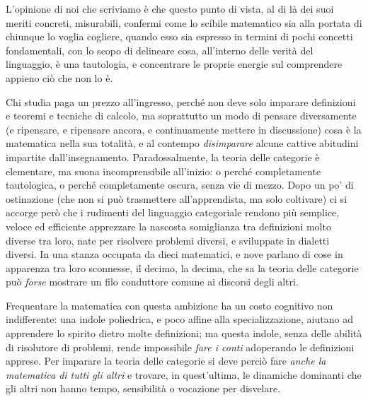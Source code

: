 \begin{itemize}
\end{itemize}
L'opinione di noi che scriviamo è che questo punto di vista, al di là dei suoi meriti concreti, misurabili, confermi come lo scibile matematico sia alla portata di chiunque lo voglia cogliere, quando esso sia espresso in termini di pochi concetti fondamentali, con lo scopo di delineare cosa, all'interno delle verità del linguaggio, è una tautologia, e concentrare le proprie energie sul comprendere appieno ciò che non lo è.

Chi studia paga un prezzo all'ingresso, perché non deve solo imparare definizioni e teoremi e tecniche di calcolo, ma soprattutto un modo di pensare diversamente (e ripensare, e ripensare ancora, e continuamente mettere in discussione) cosa è la matematica nella sua totalità, e al contempo \emph{disimparare} alcune cattive abitudini impartite dall'insegnamento. Paradossalmente, la teoria delle categorie è elementare, ma suona incomprensibile all'inizio: o perché completamente tautologica, o perché completamente oscura, senza vie di mezzo. Dopo un po' di ostinazione (che non si può trasmettere all'apprendista, ma solo coltivare) ci si accorge però che i rudimenti del linguaggio categoriale rendono più semplice, veloce ed efficiente apprezzare la nascosta somiglianza tra definizioni molto diverse tra loro, nate per risolvere problemi diversi, e sviluppate in dialetti diversi. In una stanza occupata da dieci matematici, e nove parlano di cose in apparenza tra loro sconnesse, il decimo, la decima, che sa la teoria delle categorie può \emph{forse} mostrare un filo conduttore comune ai discorsi degli altri.

Frequentare la matematica con questa ambizione ha un costo cognitivo non indifferente: una indole poliedrica, e poco affine alla specializzazione, aiutano ad apprendere lo spirito dietro molte definizioni; ma questa indole, senza delle abilità di risolutore di problemi, rende impossibile \emph{fare i conti} adoperando le definizioni apprese. Per imparare la teoria delle categorie si deve perciò fare \emph{anche la matematica di tutti gli altri} e trovare, in quest'ultima, le dinamiche dominanti che gli altri non hanno tempo, sensibilità o vocazione per disvelare.

